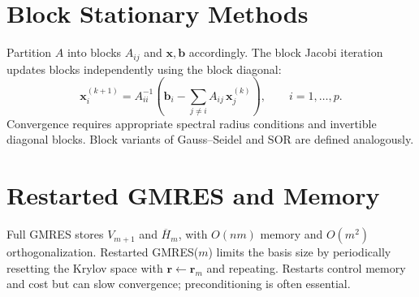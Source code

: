 \section{Block Stationary Methods}
Partition $A$ into blocks $A_{ij}$ and $\mathbf{x},\mathbf{b}$ accordingly. The block Jacobi iteration updates blocks independently using the block diagonal:
\[
  \mathbf{x}_i^{(k+1)} = A_{ii}^{-1}\left(\mathbf{b}_i - \sum_{j\ne i} A_{ij}\,\mathbf{x}_j^{(k)}\right),\qquad i=1,\dots,p.
\]
Convergence requires appropriate spectral radius conditions and invertible diagonal blocks. Block variants of Gauss–Seidel and SOR are defined analogously.

\section{Restarted GMRES and Memory}
Full GMRES stores $V_{m+1}$ and $\overline H_m$, with $O(nm)$ memory and $O(m^2)$ orthogonalization. Restarted GMRES($m$) limits the basis size by periodically resetting the Krylov space with $\mathbf{r}\leftarrow\mathbf{r}_m$ and repeating. Restarts control memory and cost but can slow convergence; preconditioning is often essential.
